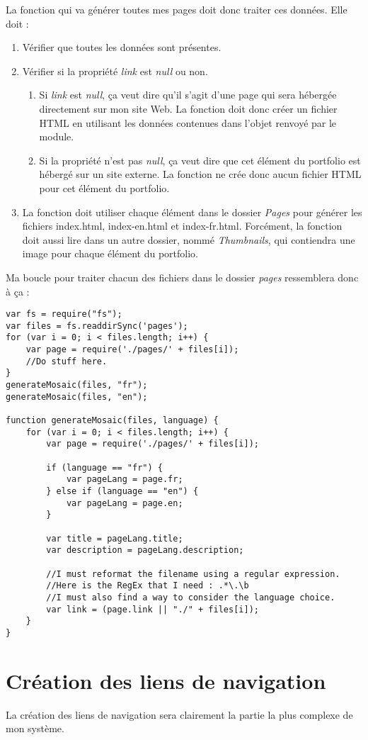 La fonction qui va générer toutes mes pages doit donc traiter ces données. Elle doit :
\begin{enumerate}  
\item Vérifier que toutes les données sont présentes.
\item Vérifier si la propriété \textit{link} est \textit{null} ou non. 
\begin{enumerate} 
\item Si \textit{link} est \textit{null}, ça veut dire qu'il s'agit d'une page qui sera hébergée directement sur mon site Web. La fonction doit donc créer un fichier HTML en utilisant les données contenues dans l'objet renvoyé par le module.
\item Si la propriété n'est pas \textit{null}, ça veut dire que cet élément du portfolio est hébergé sur un site externe. La fonction ne crée donc aucun fichier HTML pour cet élément du portfolio.
\end{enumerate} 
\item La fonction doit utiliser chaque élément dans le dossier \textit{Pages} pour générer les fichiers index.html, index-en.html et index-fr.html. Forcément, la fonction doit aussi lire dans un autre dossier, nommé \textit{Thumbnails}, qui contiendra une image pour chaque élément du portfolio.

\end{enumerate}

Ma boucle pour traiter chacun des fichiers dans le dossier \textit{pages} ressemblera donc à ça :

\begin{lstlisting}
var fs = require("fs");
var files = fs.readdirSync('pages');
for (var i = 0; i < files.length; i++) {
    var page = require('./pages/' + files[i]);
    //Do stuff here.
}
generateMosaic(files, "fr");
generateMosaic(files, "en");

function generateMosaic(files, language) {
    for (var i = 0; i < files.length; i++) {
        var page = require('./pages/' + files[i]);

        if (language == "fr") {
            var pageLang = page.fr;
        } else if (language == "en") {
            var pageLang = page.en;
        }
        
        var title = pageLang.title;
        var description = pageLang.description;
    
        //I must reformat the filename using a regular expression. 
        //Here is the RegEx that I need : .*\.\b
        //I must also find a way to consider the language choice.
        var link = (page.link || "./" + files[i]);
    }
}
\end{lstlisting}



\section{Création des liens de navigation}
La création des liens de navigation sera clairement la partie la plus complexe de mon système.